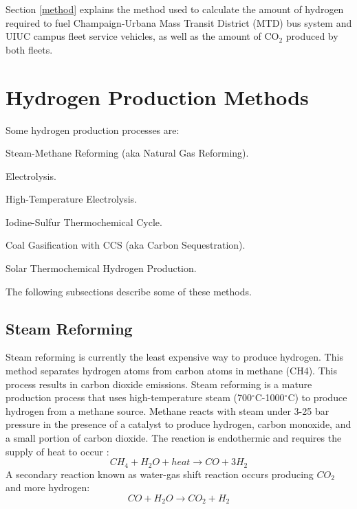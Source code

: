 \documentclass{anstrans}
\begin{document}
Section \ref{method} explains the method used to calculate the amount of hydrogen required to fuel Champaign-Urbana Mass Transit District (MTD) bus system and UIUC campus fleet service vehicles, as well as the amount of CO$_2$ produced by both fleets. 

\section{Hydrogen Production Methods}
\label{section:hydroprod}

Some hydrogen production processes are: 
\begin{description}[font=$\bullet$\scshape\bfseries]
	\item[] Steam-Methane Reforming (aka Natural Gas Reforming).
	\item[] Electrolysis.
	\item[] High-Temperature Electrolysis.
	\item[] Iodine-Sulfur Thermochemical Cycle.
	\item[] Coal Gasification with CCS (aka Carbon Sequestration).
	\item[] Solar Thermochemical Hydrogen Production.
\end{description}

The following subsections describe some of these methods.

\subsection{Steam Reforming}

Steam reforming is currently the least expensive way to produce hydrogen. This method separates hydrogen atoms from carbon atoms in methane (CH4). This process results in carbon dioxide emissions.
Steam reforming is a mature production process that uses high-temperature steam (700$^{\circ}$C-1000$^{\circ}$C) to produce hydrogen from a methane source. Methane reacts with steam under 3-25 bar pressure in the presence of a catalyst to produce hydrogen, carbon monoxide, and a small portion of carbon dioxide. The reaction is endothermic and requires the supply of heat to occur \cite{noauthor_hydrogen_nodate}:
\begin{equation}
CH_4 + H_2O + heat \rightarrow CO + 3H_2
\end{equation}
A secondary reaction known as water-gas shift reaction occurs producing $CO_2$ and more hydrogen:
\begin{equation}
CO + H_2O \rightarrow CO_2 + H_2
\end{equation}
\end{document}
